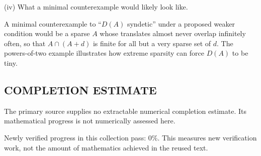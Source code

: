 (iv) What a minimal counterexample would likely look like.

A minimal counterexample to ``$D(A)$ syndetic'' under a proposed weaker condition would be a sparse $A$ whose translates almost never overlap infinitely often, so that $A\cap(A+d)$ is finite for all but a very sparse set of $d$. The powers-of-two example illustrates how extreme sparsity can force $D(A)$ to be tiny.



\subsection*{COMPLETION ESTIMATE}
The primary source supplies no extractable numerical completion estimate. Its mathematical progress is not numerically assessed here.

Newly verified progress in this collection pass: $0\%$. This measures new verification work, not the amount of mathematics achieved in the reused text.
